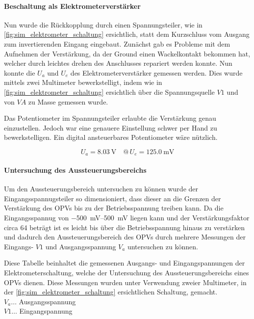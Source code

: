 \documentclass[12pt,english,ngerman]{scrartcl}
\begin{document}
\paragraph{Beschaltung als Elektrometerverstärker}
Nun wurde die Rückkopplung durch einen Spannungsteiler, wie in
\autoref{fig:sim_elektrometer_schaltung} ersichtlich, statt dem Kurzschluss vom
Ausgang zum invertierenden Eingang eingebaut. Zunächst gab es Probleme mit dem
Aufnehmen der Verstärkung, da der Ground einen Wackelkontakt bekommen hat,
welcher durch leichtes drehen des Anschlusses repariert werden konnte.
Nun konnte die $U_a$ und $U_e$ des Elektrometerverstärker gemessen werden. Dies
wurde mittels zwei Multimeter \cite{fluke175} bewerkstelligt, indem wie in
\autoref{fig:sim_elektrometer_schaltung} ersichtlich über die Spannungsquelle
$V1$ und von $VA$ zu Masse gemessen wurde.

Das Potentiometer im Spannungsteiler erlaubte die Verstärkung genau einzustellen.
Jedoch war eine genauere Einstellung schwer per Hand zu bewerkstelligen. Ein digital
ansteuerbares Potentiometer wäre nützlich.

\begin{equation}
  U_a = \SI{8.03}{\volt} \quad @\, U_e = \SI{125.0}{\milli\volt}
  \label{eq:messwert_elektro_ausgang_eingang}
\end{equation}

\paragraph{Untersuchung des Aussteuerungsbereichs} \label{sec:Versuchohnekond}
Um den Aussteuerungsbereich untersuchen zu können wurde der
Eingangsspannugsteiler so dimensioniert, dass dieser an die Grenzen der
Verstärkung des OPVs bis zu der Betriebsspannung treiben kann. Da die
Eingangsspannug von \SIrange{-500}{500}{\milli\volt} liegen kann und der Verstärkungsfaktor
circa \num{64} beträgt ist es leicht bis über die Betriebsspannung hinaus zu
verstärken und dadurch den Aussteuerungsbereich des OPVs durch mehrere
Messungen der Eingangs- $V1$ und Ausgangsspannung $V_a$ untersuchen zu können.


\begin{table}[H]
  \caption{Diese Tabelle beinhaltet die gemessenen Ausgangs- und
    Eingangspannungen der Elektrometerschaltung, welche der Untersuchung des
    Aussteuerungsbereichs eines OPVs\cite{uA741} dienen. Diese Messungen wurden
    unter Verwendung zweier Multimeter\cite{fluke175}, in der
    \autoref{fig:sim_elektrometer_schaltung} ersichtlichen Schaltung, gemacht.
    \\
  $V_a \dots$ Ausgangsspannung \\
  $V1 \dots$ Eingangspannung \\
  }
  \label{tab:mess_elektro_aussteurerung}
  \centering
  
\end{table}
\end{document}

